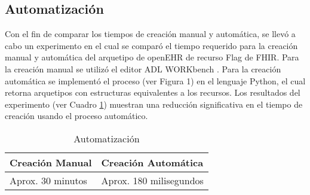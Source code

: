 \subsection{Automatización}

Con el fin de comparar los tiempos de creación manual y automática, se llevó a cabo un experimento en el cual se comparó el tiempo requerido para la creación manual y automática del arquetipo de openEHR de recurso Flag de FHIR. Para la creación manual se utilizó el editor ADL WORKbench \cite{ADLWORKbench}. Para la creación automática se implementó el proceso (ver Figura 1) en el lenguaje Python, el cual retorna arquetipos con estructuras equivalentes a los recursos. Los resultados del experimento (ver Cuadro \ref{table:automation}) muestran una reducción significativa en el tiempo de creación usando el proceso automático.

\begin{table}
  \caption{Automatización}
  \label{table:automation}
  \begin{tabular}{l l}
    \hline
    Creación Manual	& Creación Automática \\
    \hline
    Aprox. 30 minutos	& Aprox. 180 milisegundos \\
    \hline
  \end{tabular}
\end{table}

